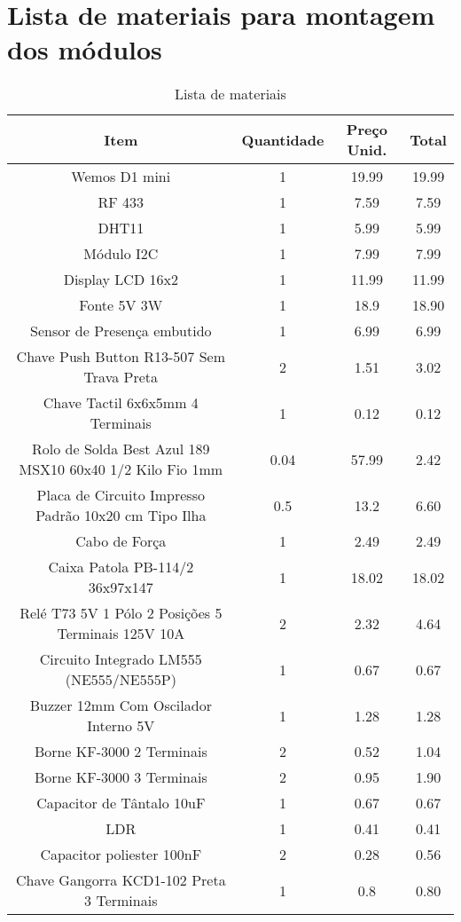 \chapter{Lista de materiais para montagem dos módulos}
\label{listamateriais}

\begin{table}[hbp]
	\caption{Lista de materiais}
	\setlength\tabcolsep{1.5pt}
	\centering
	\footnotesize
	\begin{tabular}{cccc}
		\toprule
		\textbf{Item} & \textbf{Quantidade} & \textbf{Preço Unid.} & \textbf{Total} \\
		\midrule
		Wemos D1 mini & 1 & 19.99 & 19.99 \\
		RF 433 & 1 & 7.59 & 7.59 \\
		DHT11 & 1 & 5.99 & 5.99 \\
		Módulo I2C & 1 & 7.99 & 7.99 \\
		Display LCD 16x2 & 1 & 11.99 & 11.99 \\
		Fonte 5V 3W & 1 & 18.9 & 18.90 \\
		Sensor de Presença embutido & 1 & 6.99 & 6.99 \\
		Chave Push Button R13-507 Sem Trava Preta & 2 & 1.51 & 3.02 \\
		Chave Tactil 6x6x5mm 4 Terminais & 1 & 0.12 & 0.12 \\
		Rolo de Solda Best Azul 189 MSX10 60x40 1/2 Kilo Fio 1mm & 0.04 & 57.99 & 2.42 \\
		Placa de Circuito Impresso Padrão 10x20 cm Tipo Ilha & 0.5 & 13.2 & 6.60 \\
		Cabo de Força & 1 & 2.49 & 2.49 \\
		Caixa Patola PB-114/2 36x97x147 & 1 & 18.02 & 18.02 \\
		Relé T73 5V 1 Pólo 2 Posições 5 Terminais 125V 10A & 2 & 2.32 & 4.64 \\
		Circuito Integrado LM555 (NE555/NE555P) & 1 & 0.67 & 0.67 \\
		Buzzer 12mm Com Oscilador Interno 5V & 1 & 1.28 & 1.28 \\
		Borne KF-3000 2 Terminais & 2 & 0.52 & 1.04 \\
		Borne KF-3000 3 Terminais & 2 & 0.95 & 1.90 \\
		Capacitor de Tântalo 10uF & 1 & 0.67 & 0.67 \\
		LDR & 1 & 0.41 & 0.41 \\
		Capacitor poliester 100nF & 2 & 0.28 & 0.56 \\
		Chave Gangorra KCD1-102 Preta 3 Terminais & 1 & 0.8 & 0.80 \\

\end{tabular}
\end{table}
